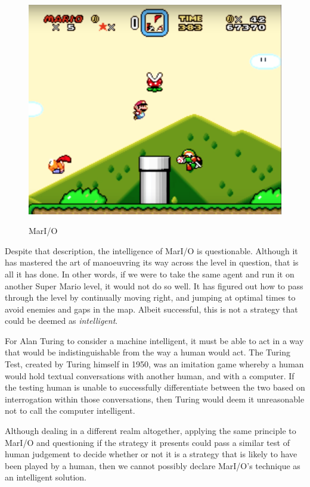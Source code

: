 \documentclass[12pt,a4paper]{article}
\begin{document}
\begin{figure}[h]
	\centering
	\includegraphics[width = \textwidth]{MarIO.png}
	\caption{MarI/O}
	\citep{MarIO} 
\end{figure}

Despite that description, the intelligence of MarI/O is questionable. Although it has mastered the art of manoeuvring its way across the level in question, that is all it has done. In other words, if we were to take the same agent and run it on another Super Mario level, it would not do so well. It has figured out how to pass through the level by continually moving right, and jumping at optimal times to avoid enemies and gaps in the map. Albeit successful, this is not a strategy that could be deemed as \textit{intelligent}.

For Alan Turing to consider a machine intelligent, it must be able to act in a way that would be indistinguishable from the way a human would act. The Turing Test, created by Turing himself in 1950, was an imitation game whereby a human would hold textual conversations with another human, and with a computer. If the testing human is unable to successfully differentiate between the two based on interrogation within those conversations, then Turing would deem it unreasonable not to call the computer intelligent\citep{TuringTest}.

Although dealing in a different realm altogether, applying the same principle to MarI/O and questioning if the strategy it presents could pass a similar test of human judgement to decide whether or not it is a strategy that is likely to have been played by a human, then we cannot possibly declare MarI/O's technique as an intelligent solution.
\end{document}
